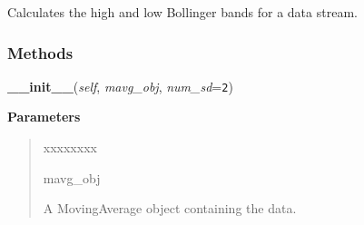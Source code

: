     \label{nukaquant:Bollinger}
Calculates the high and low Bollinger bands for a data stream.



  \subsubsection{Methods}

    \label{nukaquant:Bollinger:__init__}

    \vspace{0.5ex}

\hspace{.8\funcindent}\begin{boxedminipage}{\funcwidth}

    \raggedright \textbf{\_\_init\_\_}(\textit{self}, \textit{mavg\_obj}, \textit{num\_sd}={\tt 2})

\setlength{\parskip}{2ex}
\setlength{\parskip}{1ex}
      \textbf{Parameters}
      \vspace{-1ex}

      \begin{quote}
        \begin{Ventry}{xxxxxxxx}

          \item[mavg\_obj]

          A MovingAverage object containing the data.

        \end{Ventry}

      \end{quote}

    \end{boxedminipage}

    \label{nukaquant:Bollinger:get_bollinger}

    \vspace{0.5ex}


